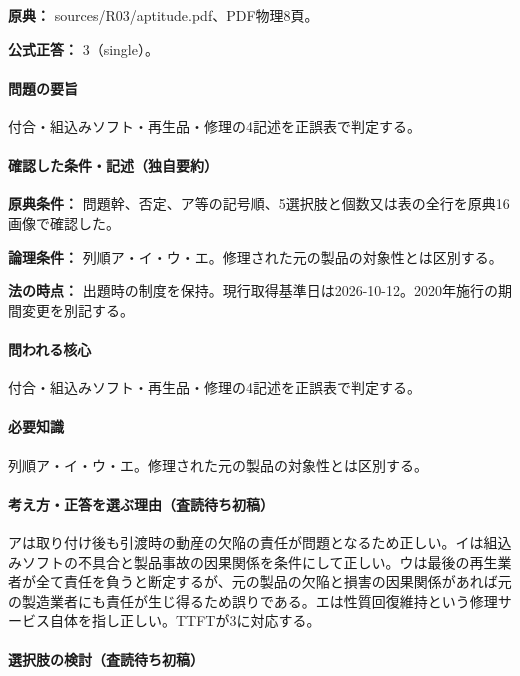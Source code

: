 \noindent\textbf{原典：} sources/R03/aptitude.pdf、PDF物理8頁。

\textbf{公式正答：} 3（single）。

\paragraph{問題の要旨} 付合・組込みソフト・再生品・修理の4記述を正誤表で判定する。

\paragraph{確認した条件・記述（独自要約）}\mbox{}\par

\noindent\textbf{原典条件：} 問題幹、否定、ア等の記号順、5選択肢と個数又は表の全行を原典16画像で確認した。\par

\noindent\textbf{論理条件：} 列順ア・イ・ウ・エ。修理された元の製品の対象性とは区別する。\par

\noindent\textbf{法の時点：} 出題時の制度を保持。現行取得基準日は2026-10-12。2020年施行の期間変更を別記する。\par

\paragraph{問われる核心} 付合・組込みソフト・再生品・修理の4記述を正誤表で判定する。

\paragraph{必要知識} 列順ア・イ・ウ・エ。修理された元の製品の対象性とは区別する。

\paragraph{考え方・正答を選ぶ理由（査読待ち初稿）} アは取り付け後も引渡時の動産の欠陥の責任が問題となるため正しい。イは組込みソフトの不具合と製品事故の因果関係を条件にして正しい。ウは最後の再生業者が全て責任を負うと断定するが、元の製品の欠陥と損害の因果関係があれば元の製造業者にも責任が生じ得るため誤りである。エは性質回復維持という修理サービス自体を指し正しい。TTFTが3に対応する。

\paragraph{選択肢の検討（査読待ち初稿）}\mbox{}\par

